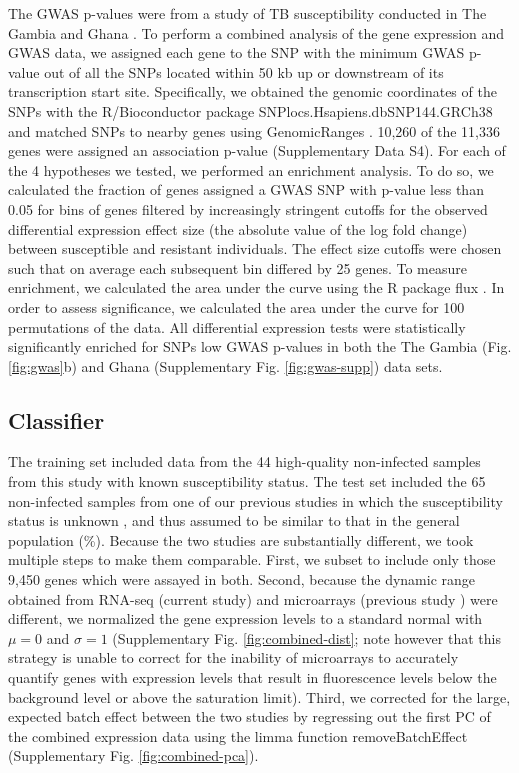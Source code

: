 \documentclass[fleqn,10pt]{wlscirep}
\begin{document}
The GWAS p-values were from a study of TB susceptibility conducted in
The Gambia and Ghana \cite{Thye2010}. To perform a combined analysis
of the gene expression and GWAS data, we assigned each gene to the SNP
with the minimum GWAS p-value out of all the SNPs located within 50 kb
up or downstream of its transcription start site. Specifically, we
obtained the genomic coordinates of the SNPs with the R/Bioconductor
\cite{Huber2015} package SNPlocs.Hsapiens.dbSNP144.GRCh38 and matched
SNPs to nearby genes using GenomicRanges \cite{Lawrence2013}. 10,260
of the 11,336 genes were assigned an association p-value
(Supplementary Data S4). For each of the 4 hypotheses we tested, we
performed an enrichment analysis. To do so, we calculated the fraction
of genes assigned a GWAS SNP with p-value less than 0.05 for bins of
genes filtered by increasingly stringent cutoffs for the observed
differential expression effect size (the absolute value of the log
fold change) between susceptible and resistant individuals. The effect
size cutoffs were chosen such that on average each subsequent bin
differed by 25 genes. To measure enrichment, we calculated the area
under the curve using the R package flux \cite{Jurasinski2014}. In
order to assess significance, we calculated the area under the curve
for 100 permutations of the data. All differential expression tests
were statistically significantly enriched for SNPs low GWAS p-values
in both the The Gambia (Fig. \ref{fig:gwas}b) and Ghana (Supplementary
Fig. \ref{fig:gwas-supp}) data sets.
\subsection*{Classifier}

The training set included data from the 44 high-quality non-infected
samples from this study with known susceptibility status. The test set
included the 65 non-infected samples from one of our previous studies
in which the susceptibility status is unknown \cite{Barreiro2012}, and
thus assumed to be similar to that in the general population
(\%). Because the two studies are substantially
different, we took multiple steps to make them comparable. First, we
subset to include only those 9,450 genes which were assayed in both.
Second, because the dynamic range obtained from RNA-seq (current
study) and microarrays (previous study \cite{Barreiro2012}) were
different, we normalized the gene expression levels to a standard
normal with $\mu = 0$ and $\sigma = 1$ (Supplementary Fig.
\ref{fig:combined-dist}; note however that this strategy is unable to
correct for the inability of microarrays to accurately quantify genes
with expression levels that result in fluorescence levels below the
background level or above the saturation limit). Third, we corrected
for the large, expected batch effect between the two studies by
regressing out the first PC of the combined expression data using the
limma function removeBatchEffect \cite{Ritchie2015} (Supplementary
Fig. \ref{fig:combined-pca}).
\end{document}
